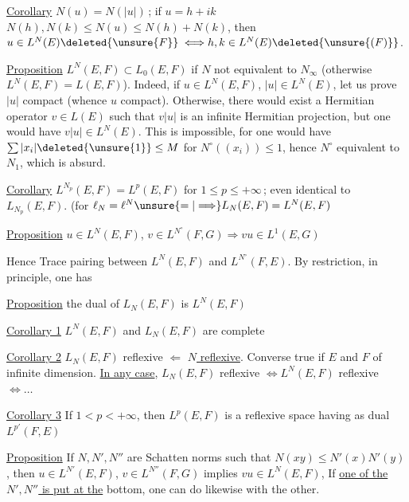 
\uline{Corollary} $N(u)=N(|u|)$\,; if $u=h+ik$ $N(h),N(k)\leq N(u)\leq N(h)+N(k)$, then $u\in L^N(E)\deleted{\unsure{F}}$ \deleted{$\Longleftrightarrow$}$\Longleftrightarrow h,k\in L^N(E)\deleted{\unsure{(F)}}$. 


\uline{Proposition} $L^N(E,F)\subset L_0(E,F)$ if $N$ not equivalent to $N_\infty$\unsure{;} (otherwise $L^N(E,F)=L(E,F)$). Indeed, if $u\in L^N(E,F)$,  $|u|\in L^N(E)$, let us prove $|u|$ compact (whence $u$ compact). Otherwise, there would exist a Hermitian operator $v\in L(E)$ such that $v|u|$ is an infinite Hermitian projection, but one would have $v|u|\in L^N(E)$. This is impossible, for one  would have $\sum|x_i|\deleted{\unsure{1}}\leq M$ for $N^\circ((x_i))\leq 1$, hence $N^\circ$ equivalent to $N_1$, which is absurd.

\uline{Corollary} $L^{N_p}(E,F)=L^p(E,F)$ for $1\leq p\leq+\infty$\,;  even identical to $L_{N_p}(E,F)$. (for $\ell_N=\ell^N\unsure{=|\Longrightarrow}L_N(E,F)=L^N(E,F)$\unsure{)}

\uline{Proposition} $u\in L^N(E,F)$, $v\in L^{N^\circ}(F,G)\Rightarrow vu\in L^1(E,G)$

Hence Trace pairing between $L^N(E,F)$ and  $L^{N^\circ}(F,E)$. By restriction,  in principle, one has

\uline{Proposition} the dual of $L_N(E,F)$ is $L^N(E,F)$

\uline{Corollary 1} $L^N(E,F)$ and $L_N(E,F)$ are complete

\uline{Corollary 2} $L_N(E,F)$ reflexive $\Leftarrow$ \uline{$N$ reflexive}.  Converse true if $E$ and $F$ of infinite dimension. \uline{In any case}, $L_N(E,F)$ reflexive $\Longleftrightarrow L^N(E,F)$ reflexive $\Longleftrightarrow\ldots$

\uline{Corollary 3} If $1<p<+\infty$, then $L^p(E,F)$ is a reflexive space having as dual $L^{p'}(F,E)$

\uline{Proposition} If $N,N',N''$ are Schatten norms such that $N(xy)\leq N'(x)N'(y)$, then $u\in L^{N'}(E,F)$, $v\in L^{N''}(F,G)$ implies $vu\in L^N(E,F)$,  If \uline{one of the  $N',N''$ is put at the} bottom, one can do likewise with the other. 

